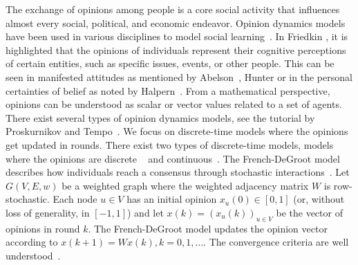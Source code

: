 

 The exchange of opinions   among people is a core social activity that influences almost every social, political, and economic endeavor.  Opinion dynamics  models  have been used in various disciplines to model social learning~\cite{acemoglu2011opinion,acemouglu2013opinion,proskurnikov2017tutorial,proskurnikov2018tutorial,lorenz2007continuous,grabisch2020survey}.   In Friedkin \cite{friedkin2015problem}, it is highlighted that the opinions of individuals represent their cognitive perceptions of certain entities, such as specific issues, events, or other people. This can be seen in manifested attitudes as mentioned by Abelson~\cite{abelson1964mathematical}, Hunter \cite{hunter1984mathematical} or in the personal certainties of belief as noted by Halpern~\cite{halpern1991relationship}. From a mathematical perspective, opinions can be understood as scalar or vector values related to a set of agents.  
There exist several types of opinion dynamics models, see the tutorial by Proskurnikov and Tempo~\cite{proskurnikov2017tutorial,proskurnikov2018tutorial}.
We focus on discrete-time models where the opinions get updated in rounds.
There exist two types of discrete-time models,  models where the opinions are discrete  ~\cite{kempe2003maximizing,richardson2002mining,yildiz2013binary,berenbrink2016bounds} and continuous~\cite{french1956formal,degroot1974reaching,castellano2009statistical,hegselmann2002opinion,friedkin1997social,tsitsiklis1986distributed,lorenz2007continuous}.
The French-DeGroot model describes how individuals reach a consensus through stochastic interactions~\cite{french1956formal,degroot1974reaching}.  Let $G(V,E,w)$ be a weighted graph where the weighted adjacency matrix $W$ is row-stochastic. Each node $u \in V$ has an initial opinion $x_u(0) \in [0,1]$ (or, without loss of generality, in  $[-1,1]$) and let $x(k)=(x_u(k))_{u \in V}$ be the vector of opinions in round $k$. The French-DeGroot model updates the opinion vector according to $x(k+1)=W x(k), k=0,1,\ldots$. The convergence criteria are well understood~\cite{proskurnikov2017tutorial}.


